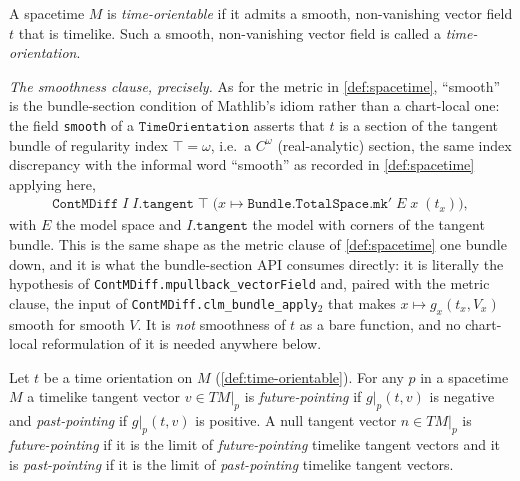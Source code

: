 \begin{definition}
    \label{def:time-orientable}
    \leanok
    A spacetime $M$ is \textit{time-orientable} if it admits a smooth, non-vanishing vector field $t$ that is timelike. Such a smooth, non-vanishing vector field is called a \textit{time-orientation}.

    \emph{The smoothness clause, precisely.} As for the metric in \ref{def:spacetime}, ``smooth'' is the bundle-section condition of Mathlib's idiom rather than a chart-local one: the field \texttt{smooth} of a $\mathtt{TimeOrientation}$ asserts that $t$ is a section of the tangent bundle of regularity index $\top = \omega$, i.e.\ a $C^\omega$ (real-analytic) section, the same index discrepancy with the informal word ``smooth'' as recorded in \ref{def:spacetime} applying here,
    \begin{align}
        \mathtt{ContMDiff}\;I\;I.\mathtt{tangent}\;\top\;\Big(x \mapsto \mathtt{Bundle.TotalSpace.mk'}\;E\;x\;(t_x)\Big),
    \end{align}
    with $E$ the model space and $I.\mathtt{tangent}$ the model with corners of the tangent bundle. This is the same shape as the metric clause of \ref{def:spacetime} one bundle down, and it is what the bundle-section API consumes directly: it is literally the hypothesis of \texttt{ContMDiff.mpullback\_vectorField} and, paired with the metric clause, the input of \texttt{ContMDiff.clm\_bundle\_apply\ensuremath{_2}} that makes $x \mapsto g_x(t_x, V_x)$ smooth for smooth $V$. It is \emph{not} smoothness of $t$ as a bare function, and no chart-local reformulation of it is needed anywhere below.
\end{definition}

\begin{definition}
    \label{def:future-and-past-pointing-vectors}
    \leanok
    Let $t$ be a time orientation on $M$ (\ref{def:time-orientable}). For any $p$ in a spacetime $M$ a timelike tangent vector $v \in TM|_p$ is \textit{future-pointing} if $g|_p(t,v)$ is negative and \textit{past-pointing} if $g|_p(t,v)$ is positive. A null tangent vector $n \in TM|_p$ is \textit{future-pointing} if it is the limit of \textit{future-pointing} timelike tangent vectors and it is \textit{past-pointing} if it is the limit of \textit{past-pointing} timelike tangent vectors.
\end{definition}

